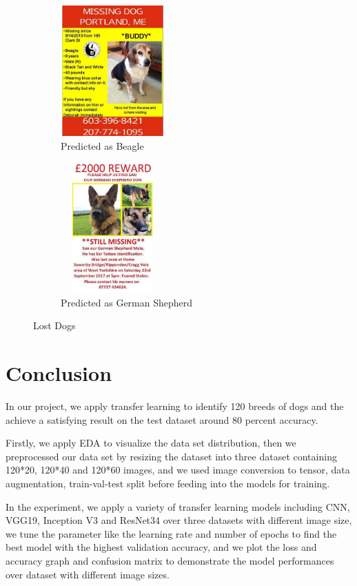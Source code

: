 \documentclass{article}
\begin{document}
\begin{figure}[h!]
    \centering
    \begin{subfigure}{.5\textwidth}
    \centering
    \includegraphics[width=4cm,height=5cm]{beagle.jpg}
    \caption{Predicted as Beagle}
    \label{fig:lost_beagle}
    \end{subfigure}%
    \begin{subfigure}{.5\textwidth}
    \centering
    \includegraphics[width=4cm,height=5cm]{german_shepherd.jpg}
    \caption{Predicted as German Shepherd}
    \label{fig:lost_shepherd}
    \end{subfigure}
    \caption{Lost Dogs}
    \label{fig:lost}
\end{figure}

\section{Conclusion}
In our project, we apply transfer learning to identify 120 breeds of dogs and the achieve a satisfying result on the test dataset around 80 percent accuracy. 

Firstly, we apply EDA to visualize the data set distribution, then we preprocessed our data set by resizing the dataset into three dataset containing 120*20, 120*40 and 120*60 images, and we used image conversion to tensor, data augmentation,  train-val-test split before feeding into the models for training. 

In the experiment, we apply a variety of transfer learning models including CNN, VGG19, Inception V3 and ResNet34 over three datasets with different image size, we tune the parameter like the learning rate and number of epochs to find the best model with the highest validation accuracy, and we plot the loss and accuracy graph and confusion matrix to demonstrate the model performances over dataset with different image sizes.
\end{document}
